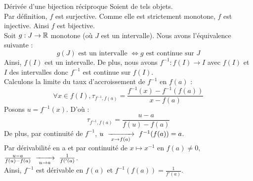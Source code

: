 \documentclass{article}
\renewenvironment{question_kholle}[2][ ]
{
	\subsection{\texorpdfstring{#2}{}}
	\notblank{#1}
	{
		\noindent #1
		\bigbreak
	}
	{}
	\begin{proof}
}
{
	\end{proof}
}
\begin{document}
\begin{question_kholle}
	[Soit $f : I \rightarrow f(I) \subset \R$ continue, strictement monotone sur $I$ et dérivable en $a \in I$.\\
		Si $f'(a) \neq 0$ alors $f$ est bijective, $f^{-1}$ est dérivable en $f(a)$ et $f^{-1}(f(a)) = \displaystyle\frac{1}{f'(a)}$.]
	{Dérivée d'une bijection réciproque}
	Soient de tels objets. \\
	Par définition, $f$ est surjective. Comme elle est strictement monotone, $f$ est injective. Ainsi $f$ est bijective. \\[4pt]
	Soit $g : J \rightarrow \mathbb R$ monotone (où $J$ est un intervalle). Nous avons l'équivalence suivante :
	\begin{equation*}
		g(J) \text{ est un intervalle } \iff g \text{ est continue sur } J
	\end{equation*}
	Ainsi, $f(I)$ est un intervalle. De plus, nous avons $f^{-1} : f(I) \rightarrow I$ avec $f(I)$ et $I$ des intervalles donc $f^{-1}$ est continue sur $f(I)$. \\
	Calculons la limite du taux d'accroissement de $f^{-1}$ en $f(a)$ :
	\begin{equation*}
		\forall x \in f(I), \tau_{f^{-1},f(a)} = \frac{f^{-1}(x) - f^{-1}(f(a))}{x - f(a)}
	\end{equation*}
	Posons $u = f^{-1}(x)$. D'où :
	\begin{equation*}
		\tau_{f^{-1},f(a)} = \frac{u - a}{f(u) - f(a)}
	\end{equation*}
	De plus, par continuité de $f^{-1}$, $u \ \xrightarrow[\;x \to f(a)\;]{}\  f^{-1}(f(a)) = a$.\\
	Par dérivabilité en a et par continuité de $x \mapsto x^{-1}$ en $f(a) \neq 0$, $\frac{u - a}{f(u) - f(a)} \ \xrightarrow[\;u \to a\;]{}\  \frac{1}{f('(a)}$. \\
	Ainsi, $f^{-1}$ est dérivable en $f(a)$ et $f^{-1}(f(a)) = \frac{1}{f'(a)}$.
\end{question_kholle}
\end{document}
